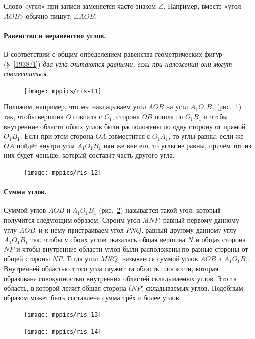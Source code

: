 \documentclass[oneside]{book}
\begin{document}
Слово «угол» при записи заменяется часто знаком $\angle$.
Например, вместо «угол $AOB$» обычно пишут:
$\angle AOB$.

\paragraph{Равенство и неравенство углов.}\label{1938/14}
В соответствии с общим определением равенства геометрических фигур (§~\ref{1938/1}) \emph{два угла считаются равными, если при наложении они могут совместиться.}

\begin{figure}[h]
\centering
\texttt{[image: mppics/ris-11]}
\caption{}\label{1938/ris-11}
\end{figure}

Положим, например, что мы накладываем угол $AOB$ на угол $A_1O_1B_1$ (рис.~\ref{1938/ris-11}) так, чтобы вершина $O$ совпала с $O_1$, сторона $OB$ пошла по $O_1B_1$ и чтобы внутренние области обоих углов были расположены по одну сторону от прямой $O_1B_1$.
Если при этом сторона $OA$ совместится с $O_1A_1$, то углы равны;
если же $OA$ пойдёт внутри угла $A_1O_1B_1$ или же вне его, то углы не равны, причём тот из них будет меньше, который составит часть другого угла.

\begin{figure}[h!]
\centering
\texttt{[image: mppics/ris-12]}
\caption{}\label{1938/ris-12}
\end{figure}

\paragraph{Сумма углов.}\label{1938/15}
Суммой углов $AOB$ и $A_1O_1B_1$ (рис.~\ref{1938/ris-12}) называется такой угол, который получится следующим образом.
Строим угол $MNP$, равный первому данному углу $AOB$, и к нему пристраиваем угол $PNQ$, равный другому данному углу $A_1O_1B_1$ так, чтобы у обоих углов оказалась общая вершина $N$ и общая сторона $NP$ и чтобы внутренние области углов были расположены по разные стороны от общей стороны $NP$.
Тогда угол $MNQ$, называется суммой углов $AOB$ и $A_1O_1B_1$.
Внутренней областью этого угла служит та область плоскости, которая образована совокупностью внутренних областей складываемых углов.
Это та область, в которой лежит общая сторона ($NP$) складываемых углов.
Подобным образом может быть составлена сумма трёх и более углов.

\begin{figure}
\centering
\texttt{[image: mppics/ris-13]}
\caption{}\label{1938/ris-13}
\bigskip
\texttt{[image: mppics/ris-14]}
\caption{}\label{1938/ris-14}
\end{figure}
\end{document}
